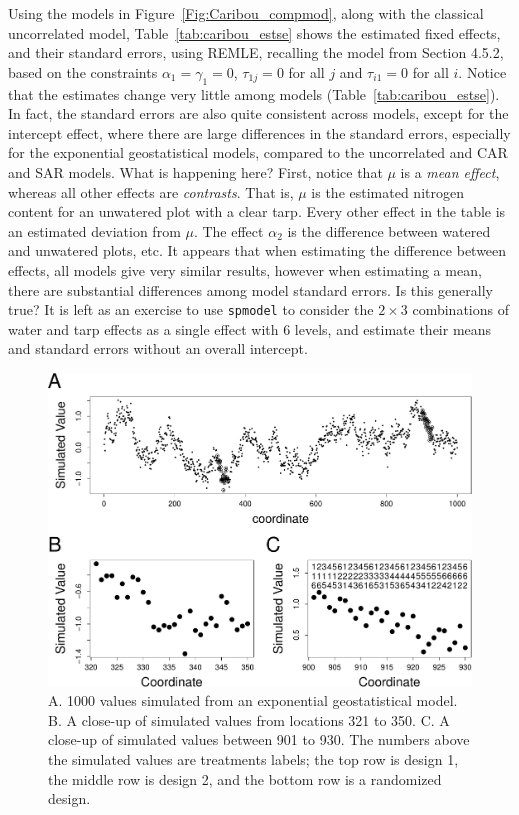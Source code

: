 \documentclass[12pt, titlepage]{article}
\begin{document}
Using the models in Figure~\ref{Fig:Caribou_compmod}, along with the classical uncorrelated model, Table~\ref{tab:caribou_estse} shows the estimated fixed effects, and their standard errors, using REMLE, recalling the model from Section 4.5.2, based on the constraints $\alpha_{1} = \gamma_{1} = 0$, $\tau_{1j} = 0$ for all $j$ and $\tau_{i1} = 0$ for all $i$.  Notice that the estimates change very little among models (Table~\ref{tab:caribou_estse}).  In fact, the standard errors are also quite consistent across models, except for the intercept effect, where there are large differences in the standard errors, especially for the exponential geostatistical models, compared to the uncorrelated and CAR and SAR models.  What is happening here?  First, notice that $\mu$ is a \textit{mean effect}, whereas all other effects are \textit{contrasts}.  That is, $\mu$ is the estimated nitrogen content for an unwatered plot with a clear tarp.  Every other effect in the table is an estimated deviation from $\mu$.  The effect $\alpha_{2}$ is the difference between watered and unwatered plots, etc.  It appears that when estimating the difference between effects, all models give very similar results, however when estimating a mean, there are substantial differences among model standard errors.  Is this generally true?  It is left as an exercise to use \texttt{spmodel} to consider the $2 \times 3$ combinations of water and tarp effects as a single effect with 6 levels, and estimate their means and standard errors without an overall intercept.

\begin{figure}[H]
  \begin{center}
	    \includegraphics[width=.8\linewidth]{Caribou_sim1000}
  \end{center}
  \caption{A. 1000 values simulated from an exponential geostatistical model. B. A close-up of simulated values from locations 321 to 350.  C. A close-up of simulated values between 901 to 930.  The numbers above the simulated values are treatments labels; the top row is design 1, the middle row is design 2, and the bottom row is a randomized design. \label{Fig:Caribou_sim1000}}
\end{figure}
\end{document}
